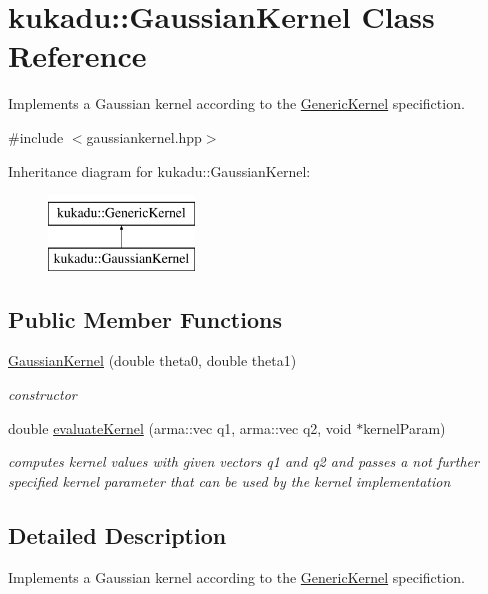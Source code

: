\hypertarget{classkukadu_1_1GaussianKernel}{\section{kukadu\-:\-:Gaussian\-Kernel Class Reference}
\label{classkukadu_1_1GaussianKernel}
}


Implements a Gaussian kernel according to the \hyperlink{classkukadu_1_1GenericKernel}{Generic\-Kernel} specifiction.  




{\ttfamily \#include $<$gaussiankernel.\-hpp$>$}

Inheritance diagram for kukadu\-:\-:Gaussian\-Kernel\-:\begin{figure}[H]
\begin{center}
\leavevmode
\includegraphics[height=2.000000cm]{classkukadu_1_1GaussianKernel}
\end{center}
\end{figure}
\subsection*{Public Member Functions}
\begin{DoxyCompactItemize}
\item 
\hyperlink{classkukadu_1_1GaussianKernel_a8f891d85494e0430cd5646bcd959585f}{Gaussian\-Kernel} (double theta0, double theta1)
\begin{DoxyCompactList}\small\item\em constructor \end{DoxyCompactList}\item 
double \hyperlink{classkukadu_1_1GaussianKernel_a11fec7aa4348f339008a454e268bf815}{evaluate\-Kernel} (arma\-::vec q1, arma\-::vec q2, void $\ast$kernel\-Param)
\begin{DoxyCompactList}\small\item\em computes kernel values with given vectors q1 and q2 and passes a not further specified kernel parameter that can be used by the kernel implementation \end{DoxyCompactList}\end{DoxyCompactItemize}


\subsection{Detailed Description}
Implements a Gaussian kernel according to the \hyperlink{classkukadu_1_1GenericKernel}{Generic\-Kernel} specifiction. 

